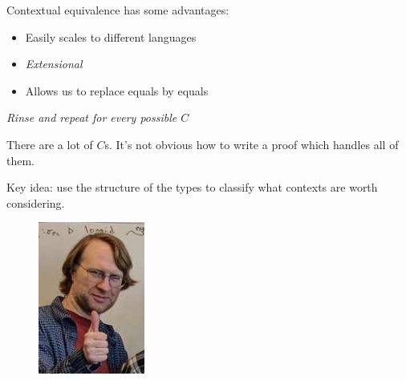 \documentclass{beamer}
\begin{document}
\begin{frame}
  Contextual equivalence has some advantages:
  \begin{itemize}
  \item Easily scales to different languages
  \item \emph{Extensional}
  \item Allows us to replace equals by equals
  \end{itemize}
\end{frame}

\begin{frame}
  \begin{center}
    \it Rinse and repeat for every possible $C$
  \end{center}
  \pause
  There are a lot of $C$s.
  \pause
  It's not obvious how to write a proof which handles all of them.
\end{frame}

\begin{frame}
  \centering
  Key idea: use {\color<2>{PaleGray} the structure of the} types
  { to classify what contexts are worth considering.}
  \pause
  \bigskip

  \begin{figure}
    \includegraphics[height=5cm,keepaspectratio]{happy-karl}
  \end{figure}
\end{frame}
\end{document}
